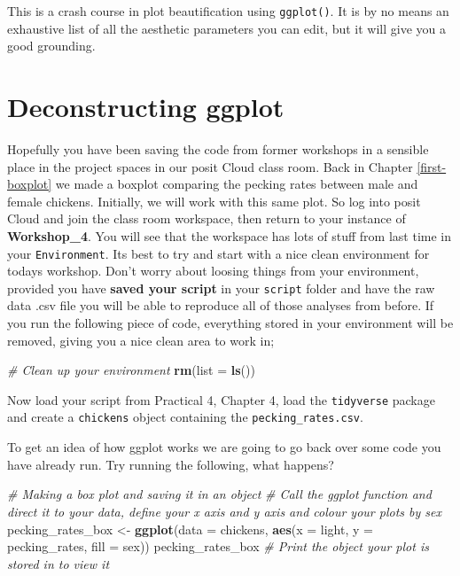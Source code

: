 \documentclass[
]{book}
\newenvironment{Shaded}{\begin{snugshade}}{\end{snugshade}}
\newcommand{\AttributeTok}[1]{\textcolor[rgb]{0.13,0.29,0.53}{#1}}
\newcommand{\CommentTok}[1]{\textcolor[rgb]{0.56,0.35,0.01}{\textit{#1}}}
\newcommand{\FunctionTok}[1]{\textcolor[rgb]{0.13,0.29,0.53}{\textbf{#1}}}
\newcommand{\NormalTok}[1]{#1}
\newcommand{\OtherTok}[1]{\textcolor[rgb]{0.56,0.35,0.01}{#1}}
\begin{document}
This is a crash course in plot beautification using \texttt{ggplot()}. It is by no means an exhaustive list of all the aesthetic parameters you can edit, but it will give you a good grounding.

\section{Deconstructing ggplot}\label{deconstructing-ggplot}

Hopefully you have been saving the code from former workshops in a sensible place in the project spaces in our posit Cloud class room. Back in Chapter \ref{first-boxplot} we made a boxplot comparing the pecking rates between male and female chickens. Initially, we will work with this same plot. So log into posit Cloud and join the class room workspace, then return to your instance of \textbf{Workshop\_4}. You will see that the workspace has lots of stuff from last time in your \texttt{Environment}. Its best to try and start with a nice clean environment for todays workshop. Don't worry about loosing things from your environment, provided you have \textbf{saved your script} in your \texttt{script} folder and have the raw data .csv file you will be able to reproduce all of those analyses from before. If you run the following piece of code, everything stored in your environment will be removed, giving you a nice clean area to work in;

\begin{Shaded}
\begin{Highlighting}[]
\CommentTok{\# Clean up your environment}
\FunctionTok{rm}\NormalTok{(}\AttributeTok{list =} \FunctionTok{ls}\NormalTok{())}
\end{Highlighting}
\end{Shaded}

Now load your script from Practical 4, Chapter 4, load the \texttt{tidyverse} package and create a \texttt{chickens} object containing the \texttt{pecking\_rates.csv}.

To get an idea of how ggplot works we are going to go back over some code you have already run. Try running the following, what happens?

\begin{Shaded}
\begin{Highlighting}[]
\CommentTok{\# Making a box plot and saving it in an object}
\CommentTok{\# Call the ggplot function and direct it to your data, define your x axis and y axis and colour your plots by sex}
\NormalTok{pecking\_rates\_box }\OtherTok{\textless{}{-}} \FunctionTok{ggplot}\NormalTok{(}\AttributeTok{data =}\NormalTok{ chickens, }\FunctionTok{aes}\NormalTok{(}\AttributeTok{x =}\NormalTok{ light, }\AttributeTok{y =}\NormalTok{ pecking\_rates, }\AttributeTok{fill =}\NormalTok{ sex)) }
\NormalTok{pecking\_rates\_box }\CommentTok{\# Print the object your plot is stored in to view it}
\end{Highlighting}
\end{Shaded}
\end{document}
